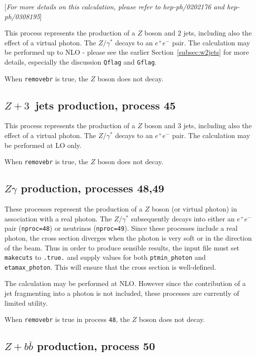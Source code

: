 \documentclass[12pt]{article}
\begin{document}
\begin{center}
[{\it For more details on this calculation, please refer to \break
 hep-ph/0202176 and hep-ph/0308195}]
\end{center}

This process represents the production of a $Z$ boson and $2$ jets,
including also the effect of a virtual photon. The $Z/\gamma^*$ decays
to an $e^+ e^-$ pair.  The calculation may be performed up to NLO -
please see the earlier Section~\ref{subsec:w2jets} for more details,
especially the discussion {\tt Qflag} and {\tt Gflag}.

When {\tt removebr} is true, the $Z$ boson does not decay.

\subsection{$Z+3$~jets production, process 45}
\label{subsec:z3jets}

This process represents the production of a $Z$ boson and $3$ jets,
including also the effect of a virtual photon. The $Z/\gamma^*$ decays
to an $e^+ e^-$ pair.  The calculation may be performed at LO only.

When {\tt removebr} is true, the $Z$ boson does not decay.

\subsection{$Z\gamma$ production, processes 48,49}
\label{subsec:zgamma}

These processes represent the production of a $Z$ boson (or virtual photon)
in association with a real photon. The $Z/\gamma^*$ subsequently decays into 
either an $e^+ e^-$ pair ({\tt nproc=48}) or neutrinos ({\tt nproc=49}).
Since these processes include a real photon, the cross section diverges
when the photon is very soft or in the direction of the beam.
Thus in order to produce sensible results, the input file must set
{\tt makecuts} to {\tt .true.} and supply values for both
{\tt ptmin\_photon} and {\tt etamax\_photon}. This will ensure that
the cross section is well-defined.

The calculation may be performed at NLO. However since the contribution
of a jet fragmenting into a photon is not included, 
these processes are currently of limited utility.


When {\tt removebr} is true in process {\tt 48}, the $Z$ boson does not decay.

\subsection{$Z+b{\bar b}$ production, process 50}
\label{subsec:zbb}
\end{document}
